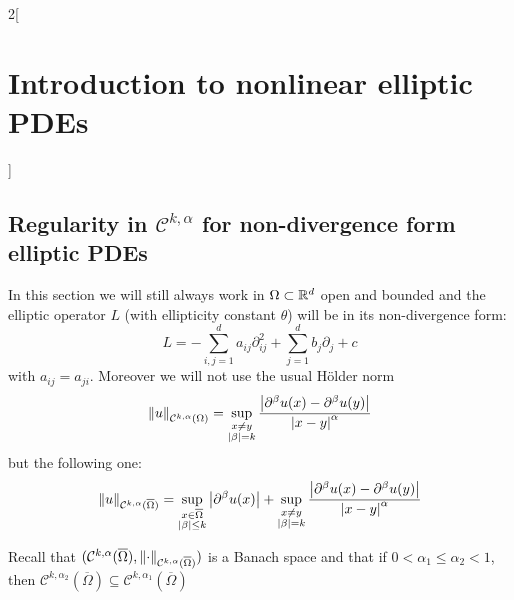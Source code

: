 \documentclass[../../../main_math.tex]{subfiles}
\begin{document}
\begin{multicols}{2}[\section{Introduction to nonlinear elliptic PDEs}]
  \subsection{Regularity in \texorpdfstring{$\mathcal{C}^{k,\alpha}$}{Ckalpha} for non-divergence form elliptic PDEs}

  In this section we will still always work in $\Omega\subset\mathbb{R}^d$ open and bounded and the elliptic operator $L$ (with ellipticity constant $\theta$) will be in its non-divergence form:
  $$
    L=-\sum_{i,j=1}^d a_{ij}\partial_{ij}^2+\sum_{j=1}^d b_j\partial_j+c
  $$
  with $a_{ij}=a_{ji}$.  Moreover we will not use the usual Hölder norm
  $$
    \left\|u\right\|_{\mathcal{C}^{k,\alpha}(\Omega)}=\sup_{\substack{x\ne y\\ \abs{\beta}=k}}\frac{\abs{\partial^\beta u(x)-\partial^\beta u(y)}}{\abs{x-y}^\alpha}
  $$
  but the following one:
  $$
    \left\|u\right\|_{\mathcal{C}^{k,\alpha}(\overline\Omega)}=\sup_{\substack{x\in \overline\Omega\\ \abs{\beta}\leq k}}\abs{\partial^\beta u(x)}+\sup_{\substack{x\ne y\\ \abs{\beta}=k}}\frac{\abs{\partial^\beta u(x)-\partial^\beta u(y)}}{\abs{x-y}^\alpha}
  $$

  \begin{remark}
    Recall that $(\mathcal{C}^{k,\alpha}(\overline\Omega),\left\|\cdot\right\|_{\mathcal{C}^{k,\alpha}(\overline\Omega)})$ is a Banach space and that if $0<\alpha_1\leq\alpha_2<1$, then $
      \mathcal{C}^{k,\alpha_2}(\overline{\Omega})\subseteq \mathcal{C}^{k,\alpha_1}(\overline{\Omega})$
  \end{remark}


\end{multicols}
\end{document}

